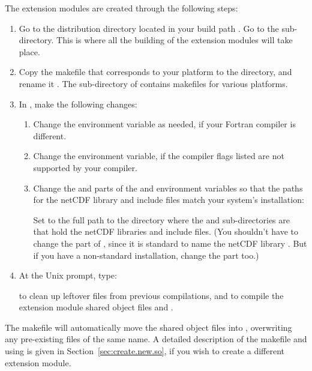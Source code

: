 The extension modules are created through the following steps:
\begin{enumerate}
\item Go to the  distribution directory
	\fn{}located in
	your build path .  Go to the 
	sub-directory.  This is where all the building of the
	extension modules will take place.

\item Copy the makefile that corresponds to your platform to
	the  directory, and rename it .
	The  sub-directory of  contains
	makefiles for various platforms.

\item In , make the following changes:
	\begin{enumerate}
	\item Change the  environment variable as needed, 
		if your Fortran compiler is different.
	\item Change the  environment variable, if the
		compiler flags listed are not supported by your
		compiler.
	\item Change the  and  parts of the
		 and  environment
		variables so that the paths for the netCDF library and
		include files match your system's installation:
		\begin{codeblock}
		\end{codeblock}
		Set  to the full path to the
		 directory where the \fn{include} and
		 sub-directories are that hold the netCDF
		libraries and include files.
		(You shouldn't have to change the  part of
		, since it is standard to name the netCDF
		library .  But if you have a non-standard
		installation, change the  part too.)
	\end{enumerate}

\item At the Unix prompt, type:
\begin{codeblock}
\end{codeblock}
	to clean up leftover files from previous compilations, and to
	compile the extension module shared object files
	 and .
\end{enumerate}

The makefile will automatically move the shared object files into
, overwriting any pre-existing files of the same name.
A detailed description of the makefile and using  is
given in Section~\ref{sec:create.new.so}, if you wish to create a
different extension module.




